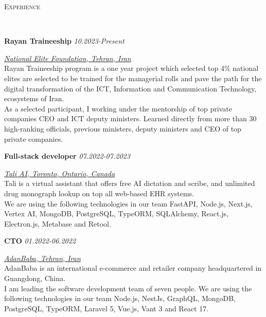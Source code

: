 \documentclass[9pt]{article}
\newenvironment{changemargin}[2]{%
  \begin{list}{}{%
    \setlength{\topsep}{0pt}%
    \setlength{\leftmargin}{#1}%
    \setlength{\rightmargin}{#2}%
    \setlength{\listparindent}{\parindent}%
    \setlength{\itemindent}{\parindent}%
    \setlength{\parsep}{\parskip}%
  }%
  \item[]}{\end{list}
}
\newcommand{\lineover}{
	\begin{changemargin}{-0.05in}{-0.05in}
		\vspace*{-8pt}
		\hrulefill \\
		\vspace*{-2pt}
	\end{changemargin}
}
\newcommand{\header}[1]{
	\begin{changemargin}{-0.5in}{-0.5in}
		\scshape{#1}\\
  	\lineover
	\end{changemargin}
}
\newenvironment{body} {
	\vspace*{-16pt}
	\begin{changemargin}{-0.25in}{-0.5in}
  }	
	{\end{changemargin}
}
\begin{document}

\header{Experience}
\begin{body}
	\vspace{18pt}

	\textbf{Rayan Traineeship} \hfill \emph{ 10.2023-Present}

	\href{https://tali.ai/}{\emph{National Elite Foundation, Tehran, Iran}} \\

	Rayan Traineeship program is a one year project which selected top 4\% national elites are selected to be trained for the managerial rolls and pave the path for the digital transformation of the ICT, Information and Communication Technology, ecosystems of Iran.\\
	As a selected participant, I working under the mentorship of top private companies CEO and ICT deputy ministers. Learned directly from more than 30 high-ranking officials, previous ministers, deputy ministers and CEO of top private companies.\\

	\vspace{5pt}

	\textbf{Full-stack developer} \hfill \emph{ 07.2022-07.2023}

	\href{https://tali.ai/}{\emph{Tali AI, Toronto, Ontario, Canada}} \\

	Tali is a virtual assistant that offers free AI dictation and scribe, and unlimited drug monograph lookup on top all web-based EHR systems.\\
	We are using the following technologies in our team FastAPI, Node.js, Next.js, Vertex AI, MongoDB, PostgreSQL, TypeORM, SQLAlchemy, React.js, Electron.js, Metabase and Retool.\\

	\vspace{5pt}

	\textbf{CTO} \hfill \emph{ 01.2022-06.2022}

	\href{https://adanbaba.com/wap.html}{\emph{AdanBaba, Tehran, Iran}} \\

	AdanBaba is an international e-commerce and retailer company headquartered in Guangdong, China.\\
	I am leading the software development team of seven people. We are using the following technologies in our team Node.js, NestJs,
	GraphQL, MongoDB, PostgreSQL, TypeORM, Laravel 5, Vue.js, Vant 3 and React 17.\\


\end{body}
\end{document}
